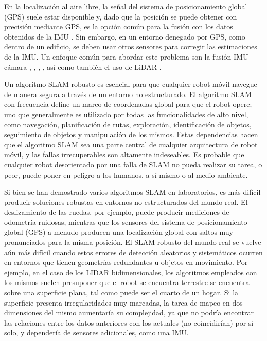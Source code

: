 \else
En la localización al aire libre, la señal del sistema de posicionamiento global (GPS) suele estar disponible y, dado que la posición se puede obtener con precisión mediante GPS, es la opción común para la fusión con los datos obtenidos de la IMU \cite{engel2014}. Sin embargo, en un entorno denegado por GPS, como dentro de un edificio, se deben usar otros sensores para corregir las estimaciones de la IMU. Un enfoque común para abordar este problema son la fusión IMU-cámara \cite{mirzaei2008}, \cite{hesch2009}, \cite{chambers2014}, \cite{hesch2013}, así como también el uso de LiDAR \cite{lee2016}.

Un algoritmo SLAM robusto es esencial para que cualquier robot móvil navegue de manera segura a través de un entorno no estructurado. El algoritmo SLAM con frecuencia define un marco de coordenadas global para que el robot opere; uno que generalmente es utilizado por todas las funcionalidades de alto nivel, como navegación, planificación de rutas, exploración, identificación de objetos, seguimiento de objetos y manipulación de los mismos. Estas dependencias hacen que el algoritmo SLAM sea una parte central de cualquier arquitectura de robot móvil, y las fallas irrecuperables son altamente indeseables. Es probable que cualquier robot desorientado por una falla de SLAM no pueda realizar su tarea, o peor, puede poner en peligro a los humanos, a sí mismo o al medio ambiente.

Si bien se han demostrado varios algoritmos SLAM en laboratorios, es más difícil producir soluciones robustas en entornos no estructurados del mundo real. El deslizamiento de las ruedas, por ejemplo, puede producir mediciones de odometría ruidosas, mientras que los sensores del sistema de posicionamiento global (GPS) a menudo producen una localización global con saltos muy pronunciados para la misma posición. El SLAM robusto del mundo real se vuelve aún más difícil cuando estos errores de detección aleatorios y sistemáticos ocurren en entornos que tienen geometrías redundantes u objetos en movimiento. Por ejemplo, en el caso de los LIDAR bidimensionales, los algoritmos empleados con los mismos suelen presuponer que el robot se encuentra terrestre se encuentra sobre una superficie plana, tal como puede ser el cuarto de un hogar. Si la superficie presenta irregularidades muy marcadas, la tarea de mapeo en dos dimensiones del mismo aumentaría su complejidad, ya que no podría encontrar las relaciones entre los datos anteriores con los actuales (no coincidirían) por si solo, y dependería de sensores adicionales, como una IMU.
\fi
